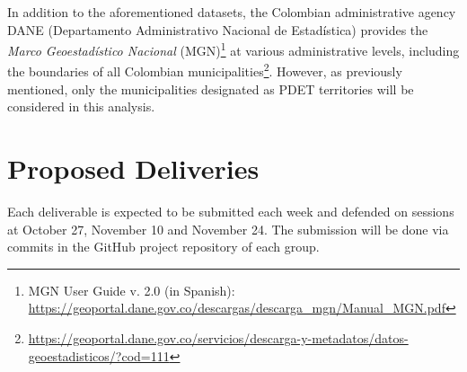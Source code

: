 \documentclass[12pt]{article}
\begin{document}
In addition to the aforementioned datasets, the Colombian administrative agency DANE (Departamento Administrativo Nacional de Estadística) provides the \textit{Marco Geoestadístico Nacional} (MGN)\footnote{MGN User Guide v. 2.0 (in Spanish): \url{https://geoportal.dane.gov.co/descargas/descarga_mgn/Manual_MGN.pdf}} at various administrative levels, including the boundaries of all Colombian municipalities\footnote{\url{https://geoportal.dane.gov.co/servicios/descarga-y-metadatos/datos-geoestadisticos/?cod=111}}. However, as previously mentioned, only the municipalities designated as PDET territories will be considered in this analysis.

\section{Proposed Deliveries}

Each deliverable is expected to be submitted each week and defended on sessions at October 27, November 10 and November 24.  The submission will be done via commits in the GitHub project repository of each group.
\end{document}
